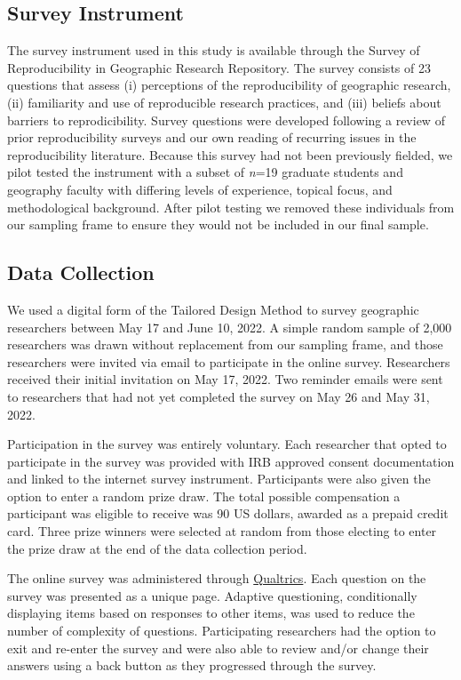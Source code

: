 \documentclass[]{interact}
\theoremstyle{plain}%
\theoremstyle{definition}
\theoremstyle{remark}
\begin{document}
\subsection*{Survey Instrument}
The survey instrument used in this study is available through the Survey of Reproducibility in Geographic Research Repository.
The survey consists of 23 questions that assess (i) perceptions of the reproducibility of geographic research, (ii) familiarity and use of reproducible research practices, and (iii) beliefs about barriers to reprodicibility. 
Survey questions were developed following a review of prior reproducibility surveys \citep[e.g.,][]{fanelli2009many,baker20161, konkol2019} and our own reading of recurring issues in the reproducibility literature. 
Because this survey had not been previously fielded, we pilot tested the instrument with a subset of \textit{n}=19 graduate students and geography faculty with differing levels of experience, topical focus, and methodological background. 
After pilot testing we removed these individuals from our sampling frame to ensure they would not be included in our final sample.

\subsection*{Data Collection}
We used a digital form of the Tailored Design Method \citep{dillman2014internet} to survey geographic researchers between May 17 and June 10, 2022.
A simple random sample of 2,000 researchers was drawn without replacement from our sampling frame, and those researchers were invited via email to participate in the online survey. 
Researchers received their initial invitation on May 17, 2022. 
Two reminder emails were sent to researchers that had not yet completed the survey on May 26 and May 31, 2022.

Participation in the survey was entirely voluntary. 
Each researcher that opted to participate in the survey was provided with IRB approved consent documentation and linked to the internet survey instrument. 
Participants were also given the option to enter a random prize draw. 
The total possible compensation a participant was eligible to receive was 90 US dollars, awarded as a prepaid credit card.
Three prize winners were selected at random from those electing to enter the prize draw at the end of the data collection period.

The online survey was administered through \href{https://www.qualtrics.com/}{Qualtrics}. 
Each question on the survey was presented as a unique page. 
Adaptive questioning, conditionally displaying items based on responses to other items, was used to reduce the number of complexity of questions.
Participating researchers had the option to exit and re-enter the survey and were also able to review and/or change their answers using a back button as they progressed through the survey.
\end{document}
